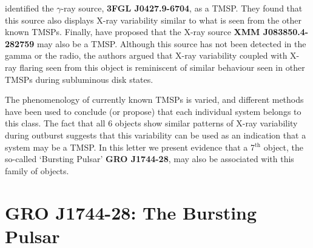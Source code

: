 \par \citealp{Strader_6} identified the $\gamma$-ray source, \textbf{3FGL J0427.9-6704}, as a TMSP.  They found that this source also displays X-ray variability similar to what is seen from the other known TMSPs.  Finally, \citealp{Rea_J0838} have proposed that the X-ray source \textbf{XMM J083850.4-282759} may also be a TMSP.  Although this source has not been detected in the gamma or the radio, the authors argued that X-ray variability coupled with X-ray flaring seen from this object is reminiscent of similar behaviour seen in other TMSPs during subluminous disk states.
\par The phenomenology of currently known TMSPs is varied, and different methods have been used to conclude (or propose) that each individual system belongs to this class.  The fact that all 6 objects show similar patterns of X-ray variability during outburst suggests that this variability can be used as an indication that a system may be a TMSP.  In this letter we present evidence that a 7$^\mathrm{th}$ object, the so-called `Bursting Pulsar' \textbf{GRO J1744-28}, may also be associated with this family of objects.

\section{GRO J1744-28: The Bursting Pulsar} \label{sec:BP}

